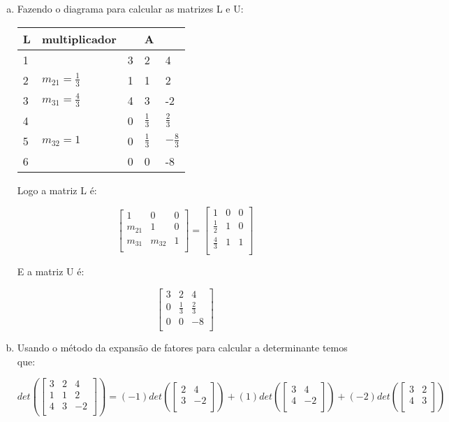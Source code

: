 \documentclass[11pt]{article}
\begin{document}
\begin{exerc}
\begin{enumerate}[a.]
\
\item
Fazendo o diagrama para calcular as matrizes L e U:

\begin{tabular}{l|l|lll|}
	L & multiplicador &  & A & \\
\hline
	1 &  & 3 & 2 & 4\\
	2 & $m_{21} = \frac{1}{3}$ & 1 & 1 & 2\\
	3 & $m_{31} = \frac{4}{3}$ & 4 & 3 & -2\\
\hline
	4 &  & 0 & $\frac{1}{3}$ & $\frac{2}{3}$\\
	5 & $m_{32} = 1$ & 0 & $\frac{1}{3}$ & $-\frac{8}{3}$\\
\hline
	6 & & 0 & 0 & -8\\
\end{tabular}

Logo a matriz L é:

$$\begin{bmatrix}
	1 & 0 & 0\\
	m_{21} & 1 & 0\\
	m_{31} & m_{32} & 1\\
\end{bmatrix}
=
\begin{bmatrix}
	1 & 0 & 0\\
	\frac{1}{2} & 1 & 0\\
	\frac{4}{3} & 1 & 1\\
\end{bmatrix}
$$

E a matriz U é:

$$\begin{bmatrix}
	3 & 2 & 4\\
	0 & \frac{1}{3} & \frac{2}{3}\\
	0 & 0 & -8\\
\end{bmatrix}
$$

\item
Usando o método da expansão de fatores para calcular a determinante temos que:

$$det(\begin{bmatrix}
	3 & 2 & 4\\
	1 & 1 & 2\\
	4 & 3 & -2\\
\end{bmatrix})
=
(-1)det(\begin{bmatrix}
	2 & 4\\
	3 & -2\\
\end{bmatrix})
+
(1)det(\begin{bmatrix}
	3 & 4\\
	4 & -2\\
\end{bmatrix})
+
(-2)det(\begin{bmatrix}
	3 & 2\\
	4 & 3\\
\end{bmatrix})$$


\end{enumerate}
\end{exerc}
\end{document}
